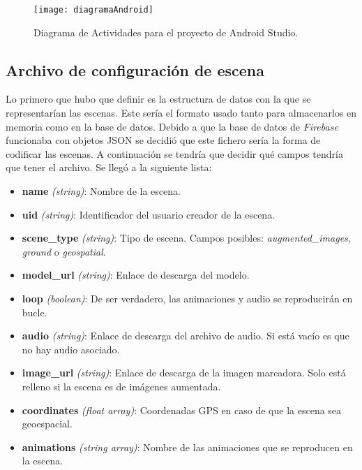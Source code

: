 \begin{figure}[h]
    \centering
    \texttt{[image: diagramaAndroid]}
    \caption[Diagrama de actividades Android Studio]{Diagrama de Actividades para el proyecto de Android Studio.}
    \label{fig:diagramaAndroid}
\end{figure}

\subsection{Archivo de configuración de escena}

Lo primero que hubo que definir es la estructura de datos con la que se representarían las escenas. Este sería el formato usado tanto para almacenarlos en memoria como en la base de datos. Debido a que la base de datos de \textit{Firebase} funcionaba con objetos JSON se decidió que este fichero sería la forma de codificar las escenas. A continuación se tendría que decidir qué campos tendría que tener el archivo. Se llegó a la siguiente lista:

\begin{itemize}
    \item \textbf{name} \textit{(string)}: Nombre de la escena.
    \item \textbf{uid} \textit{(string)}: Identificador del usuario creador de la escena.
    \item \textbf{scene\_type} \textit{(string)}: Tipo de escena. Campos posibles: \textit{augmented\_images}, \textit{ground} o \textit{geospatial}.
    \item \textbf{model\_url} \textit{(string)}: Enlace de descarga del modelo.
    \item \textbf{loop} \textit{(boolean)}: De ser verdadero, las animaciones y audio se reproducirán en bucle.
    \item \textbf{audio} \textit{(string)}: Enlace de descarga del archivo de audio. Si está vacío es que no hay audio asociado.
    \item \textbf{image\_url} \textit{(string)}: Enlace de descarga de la imagen marcadora. Solo está relleno si la escena es de imágenes aumentada.
    \item \textbf{coordinates} \textit{(float array)}: Coordenadas GPS en caso de que la escena sea geoespacial.
    \item \textbf{animations} \textit{(string array)}: Nombre de las animaciones que se reproducen en la escena.
\end{itemize}

